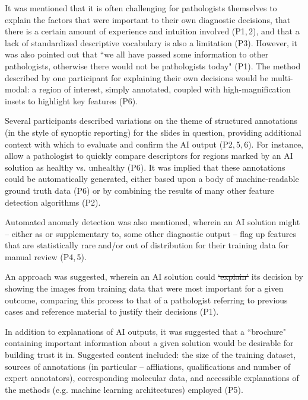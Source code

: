 \documentclass[final,5p,times,twocolumn,hyphens]{elsarticle}
\providecommand{\DIFaddtex}[1]{{\protect\color{blue}\uwave{#1}}} %
\providecommand{\DIFdeltex}[1]{{\protect\color{red}\sout{#1}}}                      %
\providecommand{\DIFaddbegin}{} %
\providecommand{\DIFaddend}{} %
\providecommand{\DIFdelbegin}{} %
\providecommand{\DIFdelend}{} %
\providecommand{\DIFadd}[1]{\texorpdfstring{\DIFaddtex{#1}}{#1}} %
\providecommand{\DIFdel}[1]{\texorpdfstring{\DIFdeltex{#1}}{}} %
\newcommand{\DIFscaledelfig}{0.5}
\newlength{\DIFdelgraphicswidth} %
\newlength{\DIFdelgraphicsheight} %
\newcommand{\DIFaddincludegraphics}[2][]{{\color{blue}\fbox{\DIFOincludegraphics[#1]{#2}}}} %
\newcommand{\DIFdelincludegraphics}[2][]{%
\sbox{\DIFdelgraphicsbox}{\DIFOincludegraphics[#1]{#2}}%
\settoboxwidth{\DIFdelgraphicswidth}{\DIFdelgraphicsbox} %
\settoboxtotalheight{\DIFdelgraphicsheight}{\DIFdelgraphicsbox} %
\scalebox{\DIFscaledelfig}{%
\parbox[b]{\DIFdelgraphicswidth}{\usebox{\DIFdelgraphicsbox}\\[-\baselineskip] \rule{\DIFdelgraphicswidth}{0em}}\llap{\resizebox{\DIFdelgraphicswidth}{\DIFdelgraphicsheight}{%
\setlength{\unitlength}{\DIFdelgraphicswidth}%
\begin{picture}(1,1)%
\thicklines\linethickness{2pt} %
{\color[rgb]{1,0,0}\put(0,0){\framebox(1,1){}}}%
{\color[rgb]{1,0,0}\put(0,0){\line( 1,1){1}}}%
{\color[rgb]{1,0,0}\put(0,1){\line(1,-1){1}}}%
\end{picture}%
}\hspace*{3pt}}} %
} %
\DeclareRobustCommand{\DIFaddbegin}{\DIFOaddbegin \let\includegraphics\DIFaddincludegraphics} %
\DeclareRobustCommand{\DIFaddend}{\DIFOaddend \let\includegraphics\DIFOincludegraphics} %
\DeclareRobustCommand{\DIFdelbegin}{\DIFOdelbegin \let\includegraphics\DIFdelincludegraphics} %
\DeclareRobustCommand{\DIFdelend}{\DIFOaddend \let\includegraphics\DIFOincludegraphics} %
\begin{document}
It was mentioned that it is often challenging for pathologists themselves to explain the factors that were important to their own diagnostic decisions, that there is a certain amount of experience and intuition involved (P1,\,2), and that a lack of standardized descriptive vocabulary is also a limitation (P3). However, it was also pointed out that ``we all have passed some information to other pathologists, otherwise there would not be pathologists today" (P1). The method described by one participant for explaining their own decisions would be multi-modal: a region of interest, simply annotated, coupled with high-magnification insets to highlight key features (P6).


Several participants described variations on the theme of structured annotations (in the style of synoptic reporting) for the slides in question, providing additional context with which to evaluate and confirm the AI output (P2,\,5,\,6). For instance, allow a pathologist to quickly compare descriptors for regions marked by an AI solution as healthy vs. unhealthy (P6). It was implied that these annotations could be automatically generated, either based upon a body of machine-readable ground truth data (P6) or by combining the results of many other feature detection algorithms (P2). 

Automated anomaly detection was also mentioned, wherein an AI solution might -- either as or supplementary to, some other diagnostic output -- flag up features that are statistically rare and/or out of distribution for their training data for manual review (P4,\,5).

An approach was suggested, wherein an AI solution could \DIFdelbegin \DIFdel{`explain' }\DIFdelend \DIFaddbegin \DIFadd{``explain'' }\DIFaddend its decision by showing the images from training data that were most important for a given outcome, comparing this process to that of a pathologist referring to previous cases and reference material to justify their decisions (P1).

In addition to explanations of AI outputs, it was suggested that a ``brochure" containing important information about a given solution would be desirable for building trust it in. Suggested content included: the size of the training dataset, sources of annotations (in particular -- affliations, qualifications and number of expert annotators), corresponding molecular data, and accessible explanations of the methods (e.g. machine learning architectures) employed (P5). 
\end{document}

